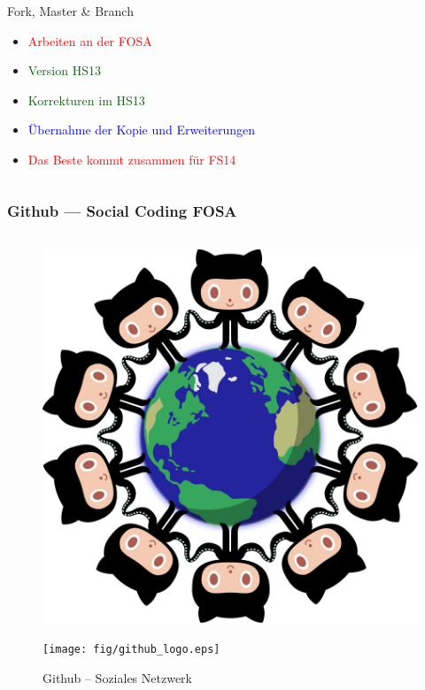 \begin{frame}
\begin{columns}
\begin{column}{5cm}
\begin{block}{Fork, Master \& Branch}
\begin{itemize}
					\item \textcolor{red}{Arbeiten an der FOSA}
					\item \textcolor{darkgreen}{Version HS13}
					\item \textcolor{darkgreen}{Korrekturen im HS13}
					\item \textcolor{blue}{Übernahme der Kopie und Erweiterungen}
		                        \item \textcolor{red}{Das Beste kommt zusammen für FS14}
				\end{itemize}
			\end{block}
		\end{column}
	\end{columns}
\end{frame}


\begin{frame}
	\frametitle{Github --- Social Coding \hfill{} \footnotesize{FOSA}}
	\begin{columns}
	        \begin{column}{5cm}
			\begin{figure}
				\centering
				\includegraphics[scale=0.08]{fig/github_network.jpg}
			\end{figure}
				\vfill{}
			\begin{figure}
				\centering
				\texttt{[image: fig/github\_logo.eps]}
				\caption{Github -- Soziales Netzwerk}

\end{figure}
\end{column}
\end{columns}
\end{frame}
